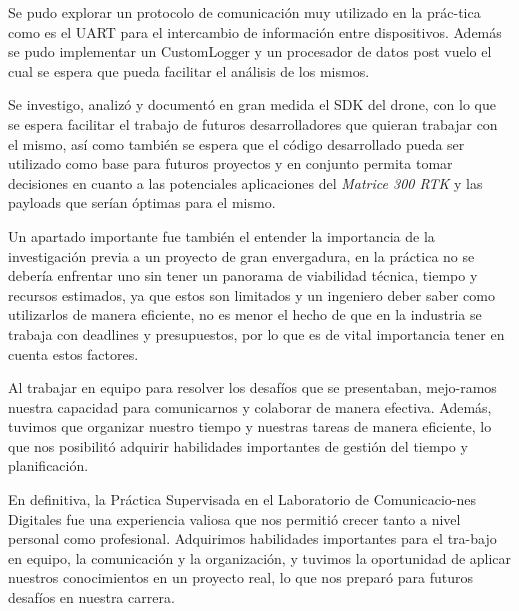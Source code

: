 \documentclass[12pt]{article}
\begin{document}
Se pudo explorar un protocolo de comunicación muy utilizado en la prác-tica como es el UART para el intercambio de información entre dispositivos. Además se pudo implementar un CustomLogger y un procesador de datos post vuelo el cual se espera que pueda facilitar el análisis de los mismos.

Se investigo, analizó y documentó en gran medida el SDK del drone, con lo que se espera facilitar el trabajo de futuros desarrolladores que quieran trabajar con el mismo, así como también se espera que el código desarrollado pueda ser utilizado como base para futuros proyectos y en conjunto permita tomar decisiones en cuanto a las potenciales aplicaciones del \textit{Matrice 300 RTK} y las payloads que serían óptimas para el mismo.

Un apartado importante fue también el entender la importancia de la investigación previa a un proyecto de gran envergadura, en la práctica no se debería enfrentar uno sin tener un panorama de viabilidad técnica, tiempo y recursos estimados, ya que estos son limitados y un ingeniero deber saber como utilizarlos de manera eficiente, no es menor el hecho de que en la industria se trabaja con deadlines y presupuestos, por lo que es de vital importancia tener en cuenta estos factores.

Al trabajar en equipo para resolver los desafíos que se presentaban, mejo-ramos nuestra capacidad para comunicarnos y colaborar de manera efectiva. Además, tuvimos que organizar nuestro tiempo y nuestras tareas de manera eficiente, lo que nos posibilitó adquirir habilidades importantes de gestión del tiempo y planificación.

En definitiva, la Práctica Supervisada en el Laboratorio de Comunicacio-nes Digitales fue una experiencia valiosa que nos permitió crecer tanto a nivel personal como profesional. Adquirimos habilidades importantes para el tra-bajo en equipo, la comunicación y la organización, y tuvimos la oportunidad de aplicar nuestros conocimientos en un proyecto real, lo que nos preparó para futuros desafíos en nuestra carrera.
\end{document}
